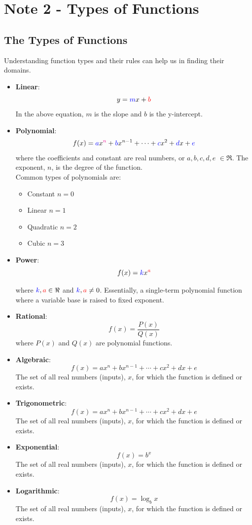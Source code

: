 \documentclass[10pt]{article}
\author{}
\date{}
\begin{document}
\section*{\centering Note 2 - Types of Functions}

\subsection*{The Types of Functions}
Understanding function types and their rules can help us in finding their domains.
\begin{itemize}
    \item \textbf{Linear}: 
    $$y = {\color{blue}m}x + {\color{red}b}$$
    In the above equation, {\color{blue}$m$} is the {\color{blue}slope} and {\color{red}$b$} is the {\color{red}y-intercept}.
    \item \textbf{Polynomial}: 
    $$f(x) = {\color{blue}a}x^{\color{magenta}n}+{\color{blue}b}x^{n-1}+\cdots+{\color{blue}c}x^2+{\color{blue}d}x+{\color{blue}e}$$
    where the coefficients and constant are real numbers, or {\color{blue}$a, b, c, d, e$} $\in \Re$.
    The exponent, {\color{magenta}$n$}, is the degree of the function. \\
    Common types of polynomials are:
    \begin{itemize}[label=$\circ$]
        \item Constant $n=0$
        \item Linear $n=1$
        \item Quadratic $n=2$
        \item Cubic $n=3$
    \end{itemize}
    \item \textbf{Power}: 
    $$f(x) = {\color{blue}k}x^{\color{red}a}$$

    where ${{\color{blue}k}, \color{red}a} \in \Re$ and ${\color{blue}k}, {\color{red}a} \neq 0$. Essentially, a single-term polynomial function where a variable base is raised to  fixed exponent.
    \item \textbf{Rational}: 
    $$f(x) = \dfrac{P(x)}{Q(x)}$$
    where $P(x)$ and $Q(x)$ are polynomial functions.
    \item \textbf{Algebraic}: 
    $$f(x) = ax^n+bx^{n-1}+\cdots+cx^2+dx+e$$
    The set of all real numbers (inputs), {\color{blue}$x$}, for which the function is defined or exists.
    \item \textbf{Trigonometric}: 
    $$f(x) = ax^n+bx^{n-1}+\cdots+cx^2+dx+e$$
    The set of all real numbers (inputs), {\color{blue}$x$}, for which the function is defined or exists.
    \item \textbf{Exponential}: 
    $$f(x) = b^x$$
    The set of all real numbers (inputs), {\color{blue}$x$}, for which the function is defined or exists.
    \item \textbf{Logarithmic}: 
    $$f(x) = \log_{b}x$$
    The set of all real numbers (inputs), {\color{blue}$x$}, for which the function is defined or exists.

\end{itemize}
\end{document}
